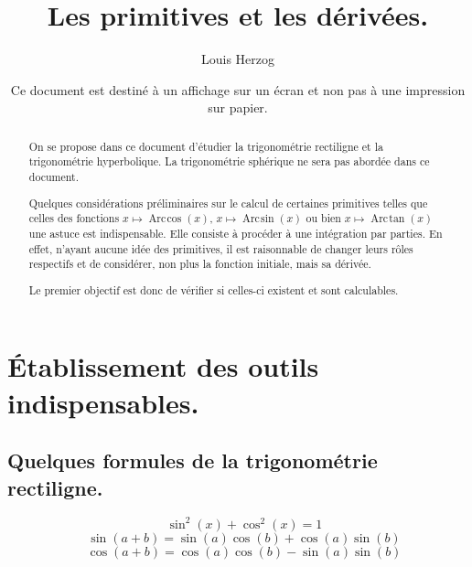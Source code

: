 \documentclass[a4paper,landscape,17pt]{extreport} %
\newcommand{\sommaire}{\shorttoc{Sommaire}{1}}
\renewcommand{\arcsin}{\mathop{\mathrm{Arc\mspace{2mu}sin}}}
\renewcommand{\arccos}{\mathop{\mathrm{Arc\mspace{2mu}cos}}}
\renewcommand{\arctan}{\mathop{\mathrm{Arc\mspace{2mu}tan}}}
\begin{document}
 


\setlength{\parindent}{0pt}



\title{Les primitives et les dérivées.}
\date{Ce document est destiné à un affichage sur un écran et non pas à une impression sur papier.}


\author{Louis Herzog} 

\maketitle 

\setcounter{tocdepth}{2}
\tableofcontents


\begin{abstract}
On se propose dans ce document d'étudier la trigonométrie rectiligne et la trigonométrie hyperbolique. La trigonométrie sphérique ne sera pas abordée dans ce document.

Quelques considérations préliminaires sur le calcul de certaines primitives telles que celles des fonctions 
 $x \mapsto \arccos(x) $,  $x \mapsto \arcsin(x) $ ou bien $x \mapsto \arctan(x) $ une astuce est indispensable. Elle consiste à procéder à une intégration par parties. En effet, n'ayant aucune idée des primitives, il est raisonnable de changer leurs rôles respectifs et de considérer, non plus la fonction initiale, mais sa dérivée.
 
Le premier objectif est donc de vérifier si celles-ci existent et sont calculables.


\end{abstract} 

\chapter{Établissement des outils indispensables.}
 
\section{Quelques formules de la trigonométrie rectiligne.} 
\begin{equation} 
\quad \sin^2(x) + \cos^2(x)  = 1 
\end{equation}
\begin{equation} 
\quad \sin(a+b)  = \sin(a)\cos(b) + \cos(a)\sin(b) 
\end{equation}
\begin{equation} 
\quad \cos(a+b)  = \cos(a)\cos(b) - \sin(a)\sin(b)  
\end{equation}
\end{document}
